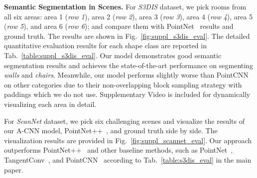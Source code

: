 \documentclass[10pt,twocolumn,letterpaper]{article}
\begin{document}
\textbf{Semantic Segmentation in Scenes. }
For \emph{S3DIS} dataset, we pick rooms from all six areas: area 1 (\textit{row 1}), area 2 (\textit{row 2}), area 3 (\textit{row 3}), area 4 (\textit{row 4}), area 5 (\textit{row 5}), and area 6 (\textit{row 6}); and compare them with PointNet~\cite{qi2017pointnet} results and ground truth. The results are shown in Fig.~\ref{fig:suppl_s3dis_eval}. The detailed quantitative evaluation results for each shape class are reported in Tab.~\ref{table:suppl_s3dis_eval}. Our model demonstrates good semantic segmentation results and achieves the state-of-the-art performance on segmenting \textit{walls} and \textit{chairs}. Meanwhile, our model performs slightly worse than PointCNN~\cite{li2018pointcnn} on other categories due to their non-overlapping block sampling strategy with paddings which we do not use. Supplementary Video is included for dynamically visualizing each area in detail.

For \emph{ScanNet} dataset, we pick six challenging scenes and visualize the results of our A-CNN model, PointNet++~\cite{qi2017pointnet++}, and ground truth side by side. The visualization results are provided in Fig.~\ref{fig:suppl_scannet_eval}. Our approach outperforms PointNet++~\cite{qi2017pointnet++} and other baseline methods, such as PointNet~\cite{qi2017pointnet}, TangentConv~\cite{tatarchenko2018tangent}, and PointCNN~\cite{li2018pointcnn} according to Tab.~\ref{table:s3dis_eval} in the main paper.
\end{document}
